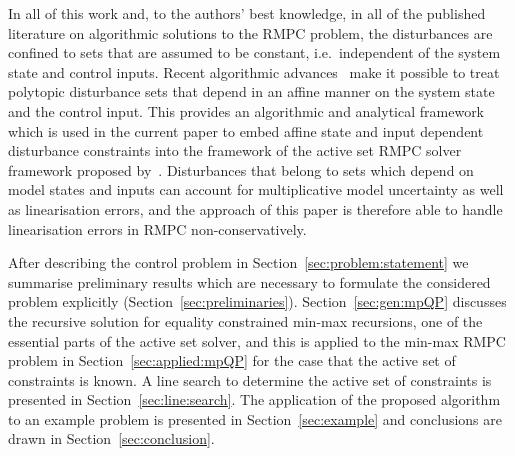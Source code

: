 \documentclass{ifacconf}
\begin{document}
In all of this work and, to the authors' best knowledge, in all of the published literature on algorithmic
solutions to the RMPC problem, the disturbances are confined to sets that are assumed to be constant,
i.e.~independent of the system state and control inputs. Recent algorithmic advances~\citep{Schaich:2015}
make it possible to treat polytopic disturbance sets that depend in an affine manner on the system state and the control
input. This provides an algorithmic and analytical framework which is used in the
current paper to embed affine state and input dependent disturbance constraints into the framework of the
active set RMPC solver framework proposed by~\cite{Buerger:2011}. Disturbances that belong to sets which depend
on model states and inputs can account for multiplicative model uncertainty as well as linearisation
errors, and the approach of this paper is therefore able to handle linearisation errors in RMPC non-conservatively.

After describing the control problem in Section~\ref{sec:problem:statement} we summarise preliminary 
results which are necessary to formulate the considered problem explicitly (Section~\ref{sec:preliminaries}).
Section~\ref{sec:gen:mpQP} discusses the recursive solution for equality constrained min-max recursions, one of 
the essential parts of the active set solver, and this is applied to the min-max RMPC problem in Section~\ref{sec:applied:mpQP}
for the case that the active set of constraints is known. A line search to determine the active set of constraints is presented
in Section~\ref{sec:line:search}. The application of the proposed algorithm to an example problem is presented in 
Section~\ref{sec:example} and conclusions are drawn in Section~\ref{sec:conclusion}.
\end{document}
